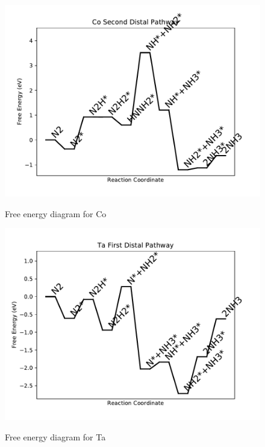 \documentclass[journal=jacsat,manuscript=article]{achemso}
\begin{document}
\begin{figure}
\includegraphics[width=1\linewidth]{data/plots/Co_distal_2.pdf}
\label{fig:Co_distal_2}
\caption{Free energy diagram for Co}
\end{figure}

\newpage
\begin{figure}
\includegraphics[width=1\linewidth]{data/plots/Ta_distal_1.pdf}
\label{fig:Ta_distal_1}
\caption{Free energy diagram for Ta}
\end{figure}
\end{document}
